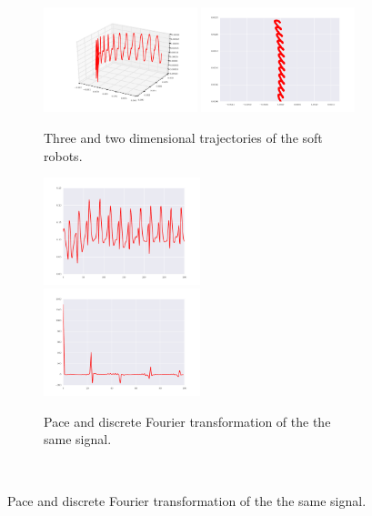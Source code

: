 \documentclass{sig-alternate}
\begin{document}
\begin{figure}[t!]
\centering
\begin{subfigure}[b]{0.47\textwidth}
\centering
\includegraphics[width=0.49\textwidth]{../Figures/Behaviors/3d.pdf}
\includegraphics[width=0.49\textwidth]{../Figures/Behaviors/2d.pdf}
\caption{Three and two dimensional trajectories of the soft robots.}
\end{subfigure}
\begin{subfigure}[t]{0.23\textwidth}
\centering
\includegraphics[width=0.5\textwidth]{../Figures/Behaviors/pace.pdf}~
\includegraphics[width=0.5\textwidth]{../Figures/Behaviors/pacedft.pdf}
\caption{Pace and discrete Fourier transformation of the the same signal.}
\end{subfigure}~

\end{figure}
\end{document}
